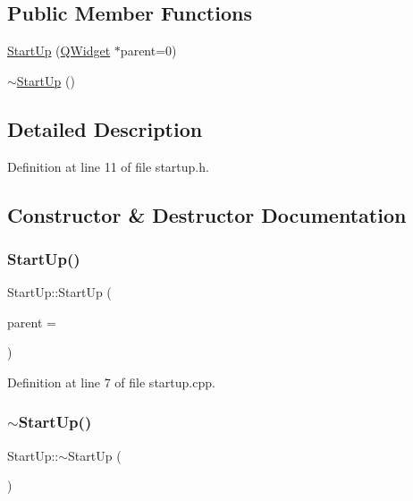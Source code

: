 \subsection*{Public Member Functions}
\begin{DoxyCompactItemize}
\item 
\hyperlink{class_start_up_a8df20d71c2bed10b67875067eb8d67a4}{Start\+Up} (\hyperlink{class_q_widget}{Q\+Widget} $\ast$parent=0)
\item 
\hyperlink{class_start_up_aec41633191799fe596459a1a47fe03c3}{$\sim$\+Start\+Up} ()
\end{DoxyCompactItemize}


\subsection{Detailed Description}


Definition at line 11 of file startup.\+h.



\subsection{Constructor \& Destructor Documentation}
\hypertarget{class_start_up_a8df20d71c2bed10b67875067eb8d67a4}{}\label{class_start_up_a8df20d71c2bed10b67875067eb8d67a4} 
\subsubsection{\texorpdfstring{Start\+Up()}{StartUp()}}
{\footnotesize\ttfamily Start\+Up\+::\+Start\+Up (\begin{DoxyParamCaption}\item[{\hyperlink{class_q_widget}{Q\+Widget} $\ast$}]{parent = {} }\end{DoxyParamCaption})\hspace{0.3cm}{\ttfamily [explicit]}}



Definition at line 7 of file startup.\+cpp.

\hypertarget{class_start_up_aec41633191799fe596459a1a47fe03c3}{}\label{class_start_up_aec41633191799fe596459a1a47fe03c3} 
\subsubsection{\texorpdfstring{$\sim$\+Start\+Up()}{~StartUp()}}
{\footnotesize\ttfamily Start\+Up\+::$\sim$\+Start\+Up (\begin{DoxyParamCaption}{ }\end{DoxyParamCaption})}



